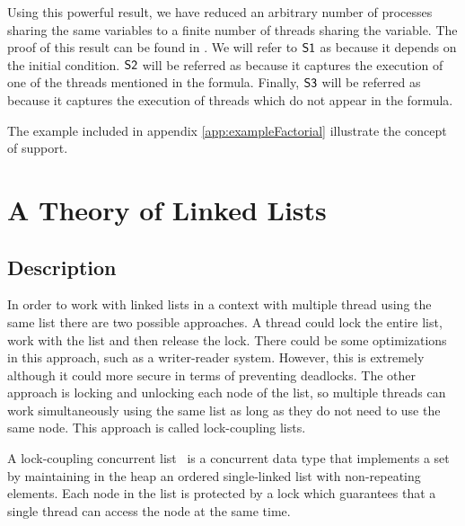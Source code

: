 Using this powerful result, we have reduced an arbitrary number of processes sharing the same variables to a finite number of threads sharing the variable. 
%
The proof of this result can be found in .
%
We will refer to $\mathsf{S1}$ as  because it depends on the initial condition.
%
$\mathsf{S2}$ will be referred as  because it captures the execution of one of the threads mentioned in the formula.
%
Finally, $\mathsf{S3}$ will be referred as  because it captures the execution of threads which do not appear in the formula. 


The example included in appendix \ref{app:exampleFactorial} illustrate the concept of support. 



\section{A Theory of Linked Lists}

\subsection{Description}

In order to work with linked lists in a context with multiple thread using the same list 
there are two possible approaches. 
%
A thread could lock the entire list, work with the list and then release the lock. 
%
There could be some optimizations in this approach, such as a writer-reader system.
%
However, this is extremely  although it could more secure in terms of preventing deadlocks.
%
The other approach is locking and unlocking each node of the list, so multiple threads can work simultaneously using the same list as long as they do not need to use the same node.
%
This approach is called lock-coupling lists.



\begin{defn}
A lock-coupling concurrent list~\cite{herlihy08art,vafeiadis06proving} is 
a concurrent data type that implements a set by maintaining in the heap an 
ordered single-linked list with non-repeating elements.
%
Each node in the list is protected by a lock which guarantees that a 
single thread can access the node at the same time.
%
\end{defn}

